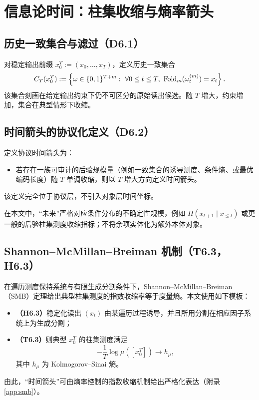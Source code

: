 \section{信息论时间：柱集收缩与熵率箭头}\label{sec:info-time}

\subsection{历史一致集合与滤过（D6.1）}

对稳定输出前缀 $x_0^T:=(x_0,\dots,x_T)$，定义历史一致集合
\[
C_T(x_0^T):=\left\{\omega\in\{0,1\}^{T+m}:\ \forall 0\le t\le T,\ \Fold_m(\omega^{(m)}_t)=x_t\right\}.
\]
该集合刻画在给定输出约束下仍不可区分的原始读出候选。随 $T$ 增大，约束增加，集合在典型情形下收缩。

\subsection{时间箭头的协议化定义（D6.2）}

定义协议时间箭头为：
\begin{itemize}
  \item 若存在一族可审计的后验规模量（例如一致集合的诱导测度、条件熵、或最优编码长度）随 $T$ 单调收缩，则以 $T$ 增大方向定义时间箭头。
\end{itemize}
该定义完全位于协议层，不引入对象层时间坐标。

\begin{remark}[“未来”的对象化口径]
在本文中，“未来”严格对应条件分布的不确定性规模，例如
$
H(x_{t+1}\mid x_{\le t})
$
或更一般的后验柱集测度收缩指标；不将余项实体化为额外本体对象。
\end{remark}

\subsection{Shannon--McMillan--Breiman 机制（T6.3，H6.3）}

在遍历测度保持系统与有限生成分割条件下，Shannon--McMillan--Breiman（SMB）定理给出典型柱集测度的指数收缩率等于度量熵。本文使用如下模板：
\begin{itemize}
  \item \textbf{（H6.3）}稳定化读出 $(x_t)$ 由某遍历过程诱导，并且所用分割在相应因子系统上为生成分割；
  \item \textbf{（T6.3）}则典型 $x_0^T$ 的柱集测度满足
  \[
  -\frac{1}{T}\log \mu([x_0^T])\to h_\mu,
  \]
  其中 $h_\mu$ 为 Kolmogorov--Sinai 熵。
\end{itemize}
由此，“时间箭头”可由熵率控制的指数收缩机制给出严格化表达（附录 \ref{app:smb}）。

